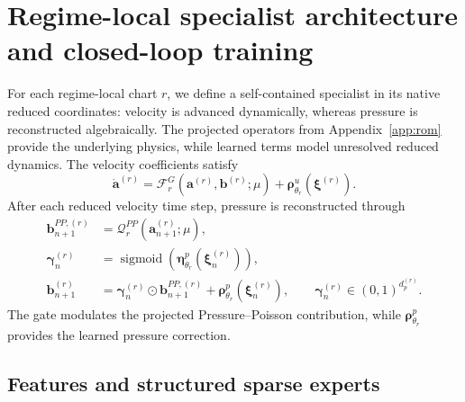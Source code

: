 \documentclass{article}
\begin{document}
\section{Regime-local specialist architecture and closed-loop training}
\label{app:specialists}

For each regime-local chart $r$, we define a self-contained 
specialist in its native reduced coordinates: velocity is advanced
dynamically, whereas pressure is reconstructed algebraically.
The projected operators from Appendix~\ref{app:rom} provide the underlying physics, while learned terms model unresolved reduced dynamics. The velocity coefficients satisfy
\begin{equation}
  \dot{\bm a}^{(r)}
  =
  \mathcal F_r^G
  \left(
    \bm a^{(r)},\bm b^{(r)};\mu
  \right)
  +
  \bm\rho^u_{\theta_r}
  \left(
    \bm\xi^{(r)}
  \right).
  \label{eq:app_hybrid_velocity_rhs}
\end{equation}
After each reduced velocity time step, pressure is reconstructed through
\begin{align}
  \bm b_{n+1}^{PP,(r)}
  &=
  \mathcal Q_r^{PP}
  \left(
    \bm a_{n+1}^{(r)};\mu
  \right),
  \nonumber\\
  \bm\gamma_n^{(r)}
  &=
  \operatorname{sigmoid}
  \left(
    \bm\eta^p_{\theta_r}
    (\bm\xi_n^{(r)})
  \right),
  \nonumber\\
  \bm b_{n+1}^{(r)}
  &=
  \bm\gamma_n^{(r)}
  \odot
  \bm b_{n+1}^{PP,(r)}
  +
  \bm\rho^p_{\theta_r}
  (\bm\xi_n^{(r)}),
  \qquad
  \bm\gamma_n^{(r)}
  \in(0,1)^{d_p^{(r)}}.
  \label{eq:app_pressure_closure}
\end{align}
The gate modulates the projected Pressure--Poisson contribution, while
$\bm\rho^p_{\theta_r}$ provides the learned pressure correction.


\subsection{Features and structured sparse experts}
\end{document}
